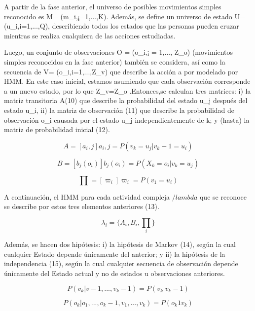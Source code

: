 \documentclass[a4paper]{article}
\begin{document}
A partir de la fase anterior, el universo de posibles movimientos simples
reconocido es M= (m_i,¡=1,...,K). Además, se define un universo de estado U= (u_i,i=1,...,Q), describiendo todos los estados que las personas pueden cruzar mientras se realiza cualquiera de las acciones estudiadas.

Luego, un conjunto de observaciones O = (o_i,¡ = 1,..., Z_o) (movimientos simples reconocidos
en la fase anterior) también se considera, así como la secuencia de V= (o_i,i=1,...,Z_v) que describe la acción a por modelado por HMM. En este caso inicial, estamos asumiendo que cada observación corresponde a un nuevo estado, por lo que Z_v=Z_o .Entonces,se calculan tres matrices: i) la matriz transitoria A(10) que describe la probabilidad del estado u_j después del estado u_i, ii) la matriz de observación (11) que describe la probabilidad de observación o_i causada por el estado u_j independientemente de k; y (hasta) la matriz de probabilidad inicial (12).

\begin{equation}
  A = [a_i,j] a_i,j = P(v_k = u_j | v_k-1 = u_i)
\end{equation}

\begin{equation}
  B = [b_j(o_i)]  b_j(o_i) = P(X_k = o_i | v_k = u_j )
\end{equation}

\begin{equation}
  \prod =  [\varpi_i] \varpi_i = P(v_1 = u_i)
\end{equation}

A continuación, el HMM para cada actividad compleja $/lambda$ que se reconoce se describe por
estos tres elementos anteriores (13).

\begin{equation}
  \lambda_i = \{A_i, B_i, \prod_i\}
\end{equation}


Además, se hacen dos hipótesis: i) la hipótesis de Markov (14), según la cual cualquier Estado depende únicamente del anterior; y ii) la hipótesis de la independencia (15), según la cual cualquier secuencia de observación depende únicamente del Estado actual y no de estados u observaciones anteriores.

\begin{equation}
  P(v_k | v-1, ..., v_k-1) = P(v_k | v_k-1)
\end{equation}


\begin{equation}
  P(o_k|o_1, ..., o_k-1, v_1, ..., v_k) = P(o_k 1 v_k)
\end{equation}
\end{document}
